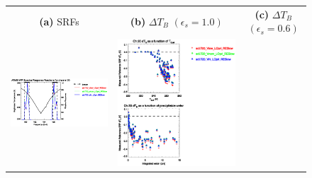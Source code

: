 \begin{figure}[H]
  \centering
  \begin{tabular}{c c c}
    \textsf{\textbf{(a)} SRFs} &
    \textsf{\textbf{(b)} $\Delta T_B$ $(\epsilon_s = 1.0)$} &
    \textsf{\textbf{(c)} $\Delta T_B$ $(\epsilon_s = 0.6)$} \\
    \includegraphics[bb=80 400 280 558,clip,scale=0.85]{graphics/srf/Vset/atms_npp.ch20.osrf.eps} &
    \includegraphics[bb=85 400 260 558,clip,scale=0.85]{graphics/dtb/Vset/e1.0_r0.0/atms_npp.ch20.dTb.eps} & 

\end{tabular}
\end{figure}
